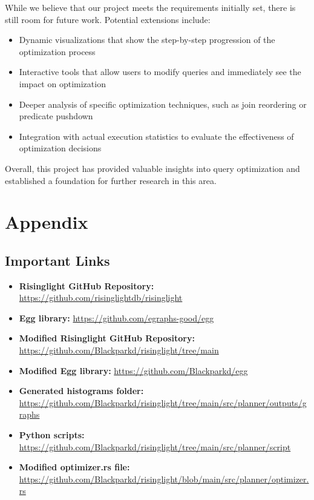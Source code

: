 \documentclass[a4paper,12pt]{scrreprt}
\begin{document}
While we believe that our project meets the requirements initially set, there is still room for future work. Potential extensions include:
\begin{itemize}
    \item Dynamic visualizations that show the step-by-step progression of the optimization process
    \item Interactive tools that allow users to modify queries and immediately see the impact on optimization
    \item Deeper analysis of specific optimization techniques, such as join reordering or predicate pushdown
    \item Integration with actual execution statistics to evaluate the effectiveness of optimization decisions
\end{itemize}

Overall, this project has provided valuable insights into query optimization and established a foundation for further research in this area.

\appendix

\chapter{Appendix}
\thispagestyle{fancy}
\section{Important Links}
\begin{itemize}
    \item \textbf{Risinglight GitHub Repository:} \url{https://github.com/risinglightdb/risinglight}
    \item \textbf{Egg library:} \url{https://github.com/egraphs-good/egg}
    \item \textbf{Modified Risinglight GitHub Repository:} \url{https://github.com/Blackparkd/risinglight/tree/main}
    \item \textbf{Modified Egg library:} \url{https://github.com/Blackparkd/egg}
    \item \textbf{Generated histograms folder:} \url{https://github.com/Blackparkd/risinglight/tree/main/src/planner/outputs/graphs}
    \item \textbf{Python scripts:} \url{https://github.com/Blackparkd/risinglight/tree/main/src/planner/script}
    \item \textbf{Modified optimizer.rs file:} \url{https://github.com/Blackparkd/risinglight/blob/main/src/planner/optimizer.rs}
\end{itemize}
\end{document}
